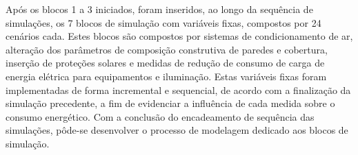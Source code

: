 \noindent Após os blocos 1 a 3 iniciados, foram inseridos, ao longo da sequência de simulações, os 7 blocos de simulação com variáveis fixas, compostos por 24 cenários cada. Estes blocos são compostos por sistemas de condicionamento de ar, alteração dos parâmetros de composição construtiva de paredes e cobertura, inserção de proteções solares e medidas de redução de consumo de carga de energia elétrica para equipamentos e iluminação. Estas variáveis fixas foram implementadas de forma incremental e sequencial, de acordo com a finalização da simulação precedente, a fim de evidenciar a influência de cada medida sobre o consumo energético.\vspace*{0.3cm} \newline
\noindent Com a conclusão do encadeamento de sequência das simulações, pôde-se desenvolver o processo de modelagem dedicado aos blocos de simulação.